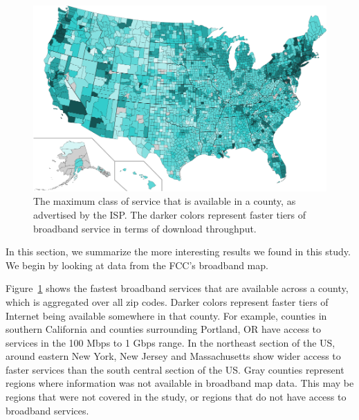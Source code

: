 \documentclass{sig-alternate-10pt}
\begin{document}
\begin{figure}
\centering
        \includegraphics[width=0.9\linewidth]{figs/counties_maxDown.pdf}
  \caption{The maximum class of service that is available in a county, as
advertised by the ISP.  The
darker colors represent faster tiers of broadband service in terms of 
download throughput.}
  \label{fig:services-repMaxRepDown}
\end{figure}

In this section, we summarize the more interesting results we found in this study. 
We begin by looking at data from the FCC's broadband map.

Figure~\ref{fig:services-repMaxRepDown} shows the fastest broadband services
that are available across a county, which is aggregated over all zip codes.
Darker colors represent faster tiers of Internet being available somewhere in
that county.  For example, counties in southern California and counties
surrounding Portland, OR have access to services in the 100 Mbps to 1 Gbps
range.  In the northeast section of the US, around eastern New York, New Jersey
and Massachusetts show wider access to faster services than the south central
section of the US.  Gray counties represent regions where information was 
not available in broadband map data.  This may be regions that were not
covered in the study, or regions that do not have access to broadband 
services.





\end{document}
